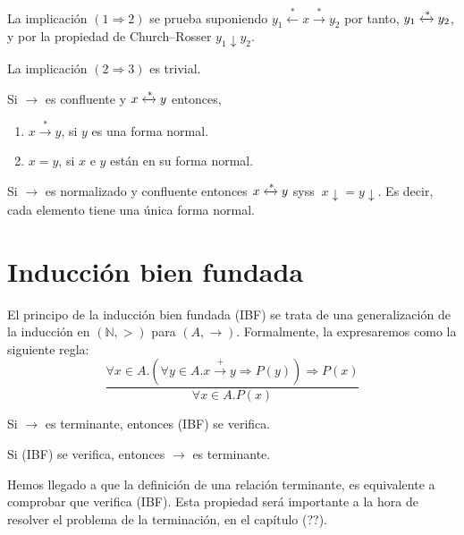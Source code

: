 \begin{demo}
  La implicación $(1 \Rightarrow 2)$ se prueba suponiendo
  $y_1 \xleftarrow{*} x \xrightarrow{*} y_2$ por tanto,
  $y_1 \xleftrightarrow{*} y_2$, y por la propiedad de Church--Rosser
  $y_1 \downarrow y_2$.  

  La implicación $(2 \Rightarrow 3)$ es trivial.
\end{demo}


\begin{coro} 
  Si $\rightarrow$ es confluente y $x \xleftrightarrow{*} y$ entonces,
  \begin{enumerate}
  \item $ x \xrightarrow{*} y$, si $y$ es una forma normal. 
  \item $x=y$, si $x$ e $y$ están en su forma normal.
  \end{enumerate}         
\end{coro}

\begin{teor}
  Si $\rightarrow$ es normalizado y confluente entonces
  $ x \xleftrightarrow{*} y$ syss $\ x \downarrow = y \downarrow$. Es decir,
  cada elemento tiene una única forma normal.
\end{teor}

\section{Inducción bien fundada}

El principo de la inducción bien fundada (IBF) se trata de una generalización
de la inducción en $(\mathbb{N},>)$ para $(A,\rightarrow)$.  Formalmente, la
expresaremos como la siguiente regla:
\begin{equation*}
  \frac{\forall x \in A. (\forall y \in A. x \xrightarrow{+} y \Rightarrow P(y)) \Rightarrow P(x)} 
       {\forall x \in A. P(x)}
\end{equation*}


\begin{teor}  
  Si $\rightarrow$ es terminante, entonces (IBF) se verifica.
\end{teor}

\begin{teor}  
  Si (IBF) se verifica, entonces $\rightarrow$ es terminante.
\end{teor}

Hemos llegado a que la definición de una relación terminante, es equivalente a
comprobar que verifica (IBF). Esta propiedad será importante a la hora de
resolver el problema de la terminación, en el capítulo (??).

